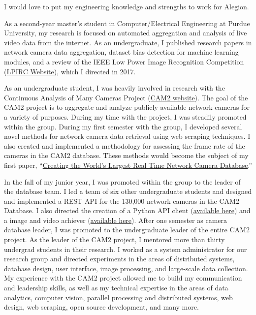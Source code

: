 \documentclass[10pt]{article}
\newcommand{\cvdurationstyle}[1]{{\small\cvdurationfont\textcolor{cvdurationcolor}{#1}}}
\newlength{\cvaftersectionskipamount}
\newcommand{\company}{Alegion}
\newcommand{\job}{Machine Learning Software Engineer}
\begin{document}

\vspace{4\cvaftersectionskipamount}

\noindent I would love to put my engineering knowledge and strengths to work for \company. 

\vspace{2\cvaftersectionskipamount}

As a second-year master's student in Computer/Electrical Engineering at Purdue University, my research is focused on automated aggregation and analysis of live video data from the internet. As an undergraduate, I published research papers in network camera data aggregation, dataset bias detection for machine learning modules, and a review of the IEEE Low Power Image Recognition Competition (\href{https://rebootingcomputing.ieee.org/lpirc}{LPIRC Website}), which I directed in 2017.  

As an undergraduate student, I was heavily involved in research with the Continuous Analysis of Many Cameras Project (\href{https://www.cam2project.net/}{CAM2 website}). The goal of the CAM2 project is to aggregate and analyze publicly available network cameras for a variety of purposes. During my time with the project, I was steadily promoted within the group. During my first semester with the group, I developed several novel methods for network camera data retrieval using web scraping techniques. I also created and implemented a methodology for assessing the frame rate of the cameras in the CAM2 database. These methods would become the subject of my first paper, “\href{https://drive.google.com/open?id=1479pCURB0qsDXMOfdWBarYYTbIyrDcYf}{Creating the World's Largest Real Time Network Camera Database}.”  

In the fall of my junior year, I was promoted within the group to the leader of the database team. I led a team of six other undergraduate students and designed and implemented a REST API for the 130,000 network cameras in the CAM2 Database. I also directed the creation of a Python API client (\href{https://github.com/PurdueCAM2Project/CameraDatabaseClient}{available here}) and a image and video achiever (\href{https://github.com/PurdueCAM2Project/CAM2ImageArchiver}{available here}). After one semester as camera database leader, I was promoted to the undergraduate leader of the entire CAM2 project. As the leader of the CAM2 project, I mentored more than thirty undergrad students in their research. I worked as a system administrator for our research group and directed experiments in the areas of distributed systems, database design, user interface, image processing, and large-scale data collection. My experience with the CAM2 project allowed me to build my communication and leadership skills, as well as my technical expertise in the areas of data analytics, computer vision, parallel processing and distributed systems, web design, web scraping, open source development, and many more. 
\end{document}
